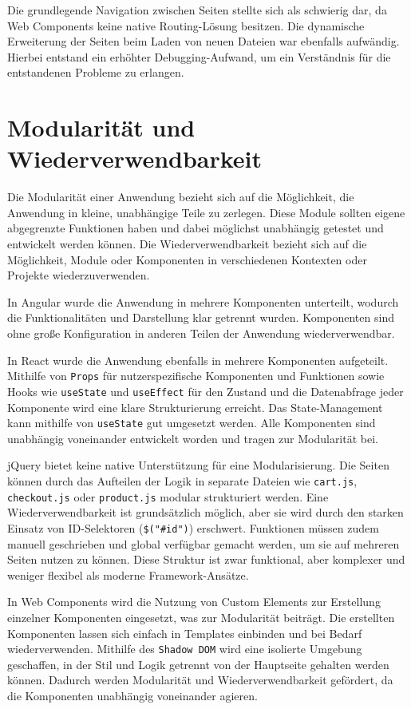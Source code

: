 \documentclass[oneside]{ausarbeitung}
\begin{document}
Die grundlegende Navigation zwischen Seiten stellte sich als schwierig dar, da Web Components keine native Routing-Lösung besitzen. Die dynamische Erweiterung der Seiten beim Laden von neuen Dateien war ebenfalls aufwändig. Hierbei entstand ein erhöhter Debugging-Aufwand, um ein Verständnis für die entstandenen Probleme zu erlangen.

\section{Modularität und Wiederverwendbarkeit}

Die Modularität einer Anwendung bezieht sich auf die Möglichkeit, die Anwendung in kleine, unabhängige Teile zu zerlegen. Diese Module sollten eigene abgegrenzte Funktionen haben und dabei möglichst unabhängig getestet und entwickelt werden können. 
Die Wiederverwendbarkeit bezieht sich auf die Möglichkeit, Module oder Komponenten in verschiedenen Kontexten oder Projekte wiederzuverwenden. 

In Angular wurde die Anwendung in mehrere Komponenten unterteilt, wodurch die Funktionalitäten und Darstellung klar getrennt wurden. Komponenten sind ohne große Konfiguration in anderen Teilen der Anwendung wiederverwendbar.  

In React wurde die Anwendung ebenfalls in mehrere Komponenten aufgeteilt. Mithilfe von \texttt{Props} für nutzerspezifische Komponenten und Funktionen sowie Hooks wie \texttt{useState} und \texttt{useEffect} für den Zustand und die Datenabfrage jeder Komponente wird eine klare Strukturierung erreicht. Das State-Management kann mithilfe von \texttt{useState} gut umgesetzt werden. Alle Komponenten sind unabhängig voneinander entwickelt worden und tragen zur Modularität bei.  

jQuery bietet keine native Unterstützung für eine Modularisierung. Die Seiten können durch das Aufteilen der Logik in separate Dateien wie \texttt{cart.js}, \texttt{checkout.js} oder \texttt{product.js} modular strukturiert werden. Eine Wiederverwendbarkeit ist grundsätzlich möglich, aber sie wird durch den starken Einsatz von ID-Selektoren (\texttt{\$("\#id")}) erschwert. Funktionen müssen zudem manuell geschrieben und global verfügbar gemacht werden, um sie auf mehreren Seiten nutzen zu können. Diese Struktur ist zwar funktional, aber komplexer und weniger flexibel als moderne Framework-Ansätze.

In Web Components wird die Nutzung von Custom Elements zur Erstellung einzelner Komponenten eingesetzt, was zur Modularität beiträgt. Die erstellten Komponenten lassen sich einfach in Templates einbinden und bei Bedarf wiederverwenden. Mithilfe des \texttt{Shadow DOM} wird eine isolierte Umgebung geschaffen, in der Stil und Logik getrennt von der Hauptseite gehalten werden können. Dadurch werden Modularität und Wiederverwendbarkeit gefördert, da die Komponenten unabhängig voneinander agieren.
\end{document}

